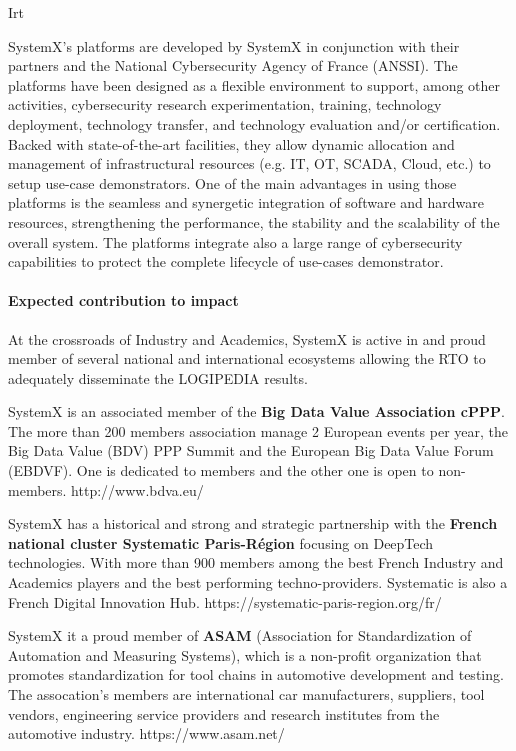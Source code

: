 \begin{sitedescription}{Irt}


SystemX’s platforms are developed by SystemX in conjunction with their partners and the National Cybersecurity Agency of France (ANSSI). The platforms have been designed as a flexible environment to support, among other activities, cybersecurity research experimentation, training, technology deployment, technology transfer, and technology evaluation and/or certification.  Backed with state-of-the-art facilities, they allow dynamic allocation and management of infrastructural resources (e.g. IT, OT, SCADA, Cloud, etc.) to setup use-case demonstrators. One of the main advantages in using those platforms is the seamless and synergetic integration of software and hardware resources, strengthening the performance, the stability and the scalability of the overall system. The platforms integrate also a large range of cybersecurity capabilities to protect the complete lifecycle of use-cases demonstrator.





\paragraph{Expected contribution to impact}
At the crossroads of Industry and Academics, SystemX is active in and proud member of several national and international ecosystems allowing the RTO to adequately disseminate the LOGIPEDIA results.

SystemX is an associated member of the {\bf Big Data Value Association cPPP}. The more than 200 members association manage 2 European events per year, the Big Data Value (BDV) PPP Summit and the European Big Data Value Forum (EBDVF). One is dedicated to members and the other one is open to non-members. http://www.bdva.eu/

SystemX has a historical and strong and strategic partnership with the {\bf French national cluster Systematic Paris-Région} focusing on DeepTech technologies. With more than 900 members among the best French Industry and Academics players and the best performing techno-providers. Systematic is also a French Digital Innovation Hub. https://systematic-paris-region.org/fr/

SystemX it a proud member of {\bf ASAM} (Association for Standardization of Automation and Measuring Systems), which is a non-profit organization that promotes standardization for tool chains in automotive development and testing. The assocation’s members are international car manufacturers, suppliers, tool vendors, engineering service providers and research institutes from the automotive industry. https://www.asam.net/


\end{sitedescription}
